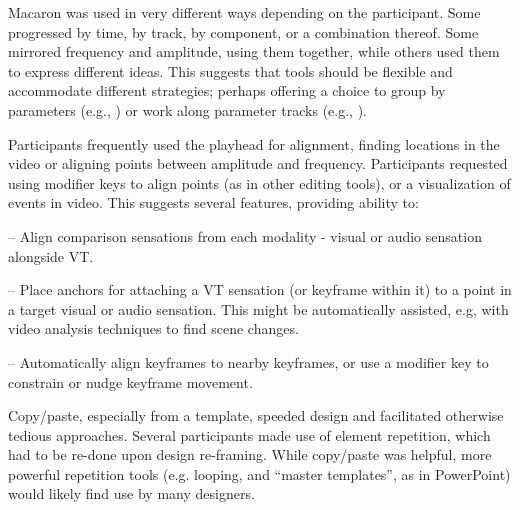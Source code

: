     Macaron was used in very different ways depending on the participant.
    Some progressed by time, by track, by component, or a combination thereof.
    Some mirrored  frequency and amplitude, using them together, while others used them to express different ideas. %
    This suggests that tools should be flexible and accommodate different strategies; perhaps offering a choice to group by parameters (e.g., \cite{Schneider2015}) or work along parameter tracks (e.g., \cite{Swindells2014,Swindells2006}).
    
    Participants frequently used the playhead for alignment, finding locations in the video or aligning points between amplitude and frequency.
    Participants requested using modifier keys to align points (as in other editing tools), or a visualization of events in video.
    This suggests several features, providing ability to:
        \par -- Align comparison sensations from each modality - visual or audio sensation alongside VT. %
        \par -- Place anchors for attaching a VT sensation (or keyframe within it) to a point in a target visual or audio sensation. This might be automatically assisted, e.g, with video analysis techniques to find scene changes.
        \par -- Automatically align keyframes to nearby keyframes, or use a modifier key to constrain or nudge keyframe movement.
    
    Copy/paste, especially from a template, speeded  design and facilitated otherwise tedious approaches.
    Several participants made use of element repetition, which had to be re-done upon design re-framing.
    While copy/paste was helpful, more powerful repetition tools (e.g. looping, and ``master templates'', as in PowerPoint) would likely find use by many designers.
    
